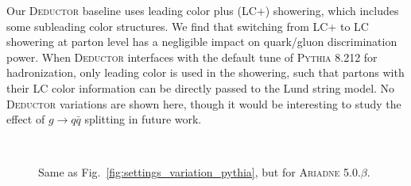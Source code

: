 \documentclass[11pt,letterpaper]{article}
\DeclareRobustCommand{\Fig}[1]{Fig.~\ref{#1}}
\begin{document}
Our \textsc{Deductor} baseline uses leading color plus (LC+) showering, which includes some subleading color structures. We find that switching from LC+ to LC showering at parton level has a negligible impact on quark/gluon discrimination power.  When \textsc{Deductor} interfaces with the default tune of \textsc{Pythia 8.212} for hadronization, only leading color is used in the showering, such that partons with their LC color information can be directly passed to the Lund string model.  No \textsc{Deductor} variations are shown here, though it would be interesting to study the effect of $g \to q \bar{q}$ splitting in future work.

\begin{figure}
\centering
{}
$\qquad$
\caption{Same as \Fig{fig:settings_variation_pythia}, but for \textsc{Ariadne 5.0.$\beta$}.}
\label{fig:settings_variation_ariadne}
\end{figure}
\end{document}
